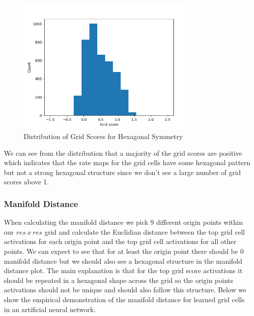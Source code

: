 \documentclass[12pt, letterpaper]{article}
\begin{document}
\begin{figure}[H]
    \centering
    \includegraphics[width=0.8\textwidth]{grid_score_histogram.png}
    \caption{Distribution of Grid Scores for Hexagonal Symmetry}
    \label{fig:grid_score_histogram}
\end{figure}

We can see from the distribution that a majority of the grid scores are positive which indicates that the rate maps for the grid cells have some hexagonal pattern but not a strong hexagonal structure since we don't see a large number of grid scores above 1.


\subsubsection{Manifold Distance}

When calculating the manifold distance we pick $9$ different origin points within our $res\ x\ res$ grid and calculate the Euclidian distance between the top grid cell activations for each origin point and the top grid cell activations for all other points. We can expect to see that for at least the origin point there should be $0$ manifold distance but we should also see a hexagonal structure in the manifold distance plot. The main explanation is that for the top grid score activations it should be repeated in a hexagonal shape across the grid so the origin points activations should not be unique and should also follow this structure. Below we show the empirical demonstration of the manifold distance for learned grid cells in an artificial neural network.
\end{document}
